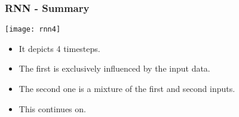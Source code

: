 

\begin{frame}[fragile] \frametitle{RNN - Summary}
\begin{center}
\texttt{[image: rnn4]}
\end{center}
\begin{itemize}
\item It depicts 4 timesteps. 
\item The first is exclusively influenced by the input data. 
\item The second one is a mixture of the first and second inputs. 
\item This continues on. 
\end{itemize}
\end{frame}


